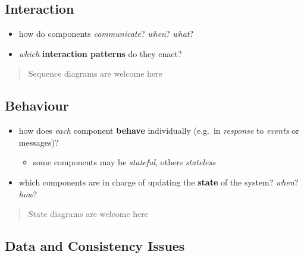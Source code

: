 \documentclass{scrartcl}
\begin{document}
\subsection{Interaction}\label{interaction}

\begin{itemize}
  \item how do components \emph{communicate}? \emph{when}? \emph{what}?
  \item \emph{which} \textbf{interaction patterns} do they enact?
\end{itemize}

\begin{quote}
Sequence diagrams are welcome here
\end{quote}

\subsection{Behaviour}\label{behaviour}

\begin{itemize}
  \item how does \emph{each} component \textbf{behave} individually (e.g.~in
  \emph{response} to \emph{events} or messages)?

  \begin{itemize}
    \item some components may be \emph{stateful}, others \emph{stateless}
  \end{itemize}
  \item which components are in charge of updating the \textbf{state} of the
  system? \emph{when}? \emph{how}?
\end{itemize}

\begin{quote}
State diagrams are welcome here
\end{quote}

\subsection{Data and Consistency
Issues}\label{data-and-consistency-issues}
\end{document}
